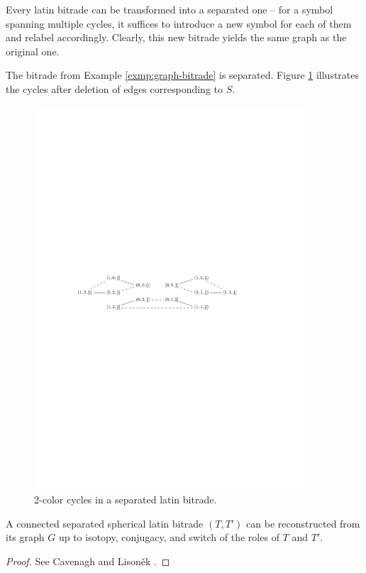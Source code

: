 Every latin bitrade can be transformed into a separated one -- for a symbol spanning multiple cycles, it suffices to introduce a new symbol for each of them and relabel accordingly. Clearly, this new bitrade yields the same graph as the original one.

\begin{exmp}
The bitrade from Example \ref{exmp:graph-bitrade} is separated. Figure \ref{fig:separated-graph} illustrates the cycles after deletion of edges corresponding to $S$.

\begin{figure}[htb]
\centering
\includegraphics[width=0.9\textwidth]{img/separated.pdf}
\caption{2-color cycles in a separated latin bitrade.}
\label{fig:separated-graph}
\end{figure}
\end{exmp}%


\begin{thm}
A connected separated spherical latin bitrade $(T,T')$ can be reconstructed from its graph $G$ up to isotopy, conjugacy, and switch of the roles of $T$ and $T'$.
\end{thm}%
\begin{proof}
See Cavenagh and Lisoněk \cite{CavenaghLisonek08}.
\end{proof}




